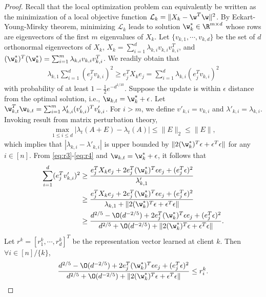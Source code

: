 \documentclass[a4paper,11pt]{article}
\begin{document}
\begin{proof}
Recall that the local optimization problem can equivalently be written as the minimization of a local objective function $\mathcal{L}_k = \|X_k - \w^T \w \|^2$. By Eckart-Young-Mirsky theorem, minimizing $\mathcal{L}_k$ leads to solution $\w_k^* \in \R^{m \times d}$ whose rows are eigenvectors of the first $m$ eigenvalues of $X_k$. Let $\{v_{k, 1}, \cdots, v_{k, d} \}$ be the set of $d$ orthonormal eigenvectors of $X_k$, $X_k = \sum_{i=1}^d \lambda_{k, i} v_{k, i}v_{k, i}^T$, and $(\w^*_k)^T(\w^*_k) = \sum_{i=1}^m \lambda_{k, i} v_{k, i}v_{k, i}^T $. We readily obtain that 
\begin{align}\label{eq:r4}
    \lambda_{k, 1} \sum_{i=1}^d (e_j^T v_{k, i})^2 \geq e_j^T X_k e_j = \sum_{i=1}^d \lambda_{k, i} (e_j^T v_{k, i})^2
\end{align}
with probability of at least $1-\frac{1}{2}e^{-d^{1/10}}$. Suppose the update is within $\epsilon$ distance from the optimal solution, i.e., $\w_{k, t} = \w_k^* + \epsilon$. Let $\w_{k, t}^T \w_{k, t} = \sum_{i=1}^m \lambda'_{k, i} (v'_{k, i})^T v'_{k, i}$. For $i > m$, we define $v'_{k, i} = v_{k, i}$ and $\lambda'_{k, i} = \lambda_{k, i}$. Invoking result from matrix perturbation theory,
\begin{align}\label{eq:matrix}
    \max_{1\leq i \leq d} |\lambda_t(A+E) - \lambda_t(A)| \leq \|E \|_2 \leq \|E \|,
\end{align}
which implies that $ |\lambda_{k, i} - \lambda'_{k, i} |$ is upper bounded by $\|2(\w_k^*)^T \epsilon + \epsilon^T \epsilon\|$ for any $i \in [n]$. From \eqref{eq:r3}-\eqref{eq:r4} and $\w_{k, t} = \w_k^* + \epsilon $, it follows that 
\begin{align*}
    \sum_{i=1}^d (e_j^T v'_{k, i})^2 & \geq \frac{e_j^T X_k e_j + 2e_j^T (\w_k^*)^T \epsilon e_j + (e_j^T \epsilon)^2 }{\lambda'_{k, 1}} \\
    & \geq \frac{e_j^T X_k e_j + 2e_j^T (\w_k^*)^T \epsilon e_j + (e_j^T \epsilon)^2}{\lambda_{k, 1} + \|2(\w_k^*)^T \epsilon + \epsilon^T \epsilon \|} \\
    & \geq \frac{d^{2/5} - \O(d^{-2/5}) + 2e_j^T (\w_k^*)^T \epsilon e_j + (e_j^T \epsilon)^2}{d^{2/5} + \O(d^{-2/5}) + \|2(\w_k^*)^T \epsilon + \epsilon^T \epsilon \|}.
\end{align*}
Let $r^k = [r_1^k, \cdots, r_d^k ]^T $ be the representation vector learned at client $k$. Then $\forall i \in [n]/\{k \}$,
\begin{align*}
    \frac{d^{2/5} - \O(d^{-2/5}) + 2e_j^T (\w_k^*)^T \epsilon e_j + (e_j^T \epsilon)^2}{d^{2/5} + \O(d^{-2/5}) + \|2(\w_k^*)^T \epsilon + \epsilon^T \epsilon  \|} \leq r_{i}^k.
\end{align*}


\end{proof}
\end{document}
